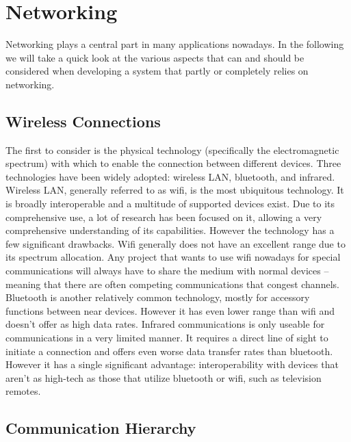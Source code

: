 \documentclass{acm_proc_article-sp}
\begin{document}
\section{Networking}

Networking plays a central part in many applications nowadays.
In the following we will take a quick look at the various aspects that can and should be considered when developing a system that partly or completely relies on networking.

\subsection{Wireless Connections}

The first to consider is the physical technology (specifically the electromagnetic spectrum) with which to enable the connection between different devices.
Three technologies have been widely adopted: wireless LAN, bluetooth, and infrared.
Wireless LAN, generally referred to as wifi, is the most ubiquitous technology.
It is broadly interoperable and a multitude of supported devices exist.
Due to its comprehensive use, a lot of research has been focused on it, allowing a very comprehensive understanding of its capabilities.
However the technology has a few significant drawbacks.
Wifi generally does not have an excellent range due to its spectrum allocation.
Any project that wants to use wifi nowadays for special communications will always have to share the medium with normal devices – meaning that there are often competing communications that congest channels.
Bluetooth is another relatively common technology, mostly for accessory functions between near devices.
However it has even lower range than wifi and doesn’t offer as high data rates.
Infrared communications is only useable for communications in a very limited manner.
It requires a direct line of sight to initiate a connection and offers even worse data transfer rates than bluetooth.
However it has a single significant advantage: interoperability with devices that aren’t as high-tech as those that utilize bluetooth or wifi, such as television remotes.

\subsection{Communication Hierarchy}
\end{document}
